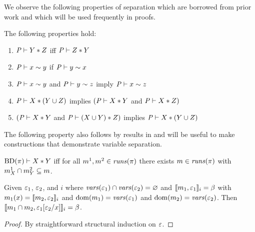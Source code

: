 We observe the following properties of separation which are borrowed from prior work
\cite{barthe2019probabilistic} and which will be used frequently in proofs. 
\begin{lemma}
  \label{lemma-separation}
  The following properties hold:
  \begin{enumerate}
  \item $\mathit{P} \vdash Y * Z$ iff $\mathit{P} \vdash Z * Y$
  \item $\mathit{P} \vdash x \sim y$ if  $\mathit{P} \vdash y \sim x$
  \item $\mathit{P} \vdash x \sim y$ and $\mathit{P} \vdash y \sim z$ imply $\mathit{P} \vdash x \sim z$
  \item $\mathit{P} \vdash X * (Y \cup Z)$ implies $(\mathit{P} \vdash X * Y$ and $\mathit{P} \vdash X * Z)$
  \item $(\mathit{P} \vdash X * Y$ and $\mathit{P} \vdash (X \cup Y) * Z)$ implies $\mathit{P} \vdash X * (Y \cup Z)$ 
  \end{enumerate}
\end{lemma}
The following property also follows by results in \cite{barthe2019probabilistic} and will
be useful to make constructions that demonstrate variable separation.
\begin{lemma}
  \label{lemma-sepjoin}
  $\mathrm{BD}(\pi) \vdash X * Y$ iff for all 
  $m^1, m^2 \in \mathit{runs}(\pi)$ there exists
  $m \in \mathit{runs}(\pi)$ with
  $m^1_{X} \cap m^2_{Y} \subseteq m$.
\end{lemma}

\begin{lemma}
  \label{lemma-presub}
  Given $\varepsilon_1$, $\varepsilon_2$, and $i$ where $\mathit{vars}(\varepsilon_1) \cap
  \mathit{vars}(\varepsilon_2) = \varnothing$ and $\llbracket m_1,\varepsilon_1 \rrbracket_{i} = \beta$
  with $m_1(x) = \llbracket m_2,\varepsilon_2 \rrbracket_{i}$ and
  $\mathrm{dom}(m_1) = \mathit{vars}(\varepsilon_1)$ and $\mathrm{dom}(m_2) = \mathit{vars}(\varepsilon_2)$.
  Then $\llbracket m_1\cap m_2,\varepsilon_1[\varepsilon_2/x] \rrbracket_{i} = \beta$.
\end{lemma}
\begin{proof}
By straightforward structural induction on $\varepsilon$.
\end{proof}

\substar*

